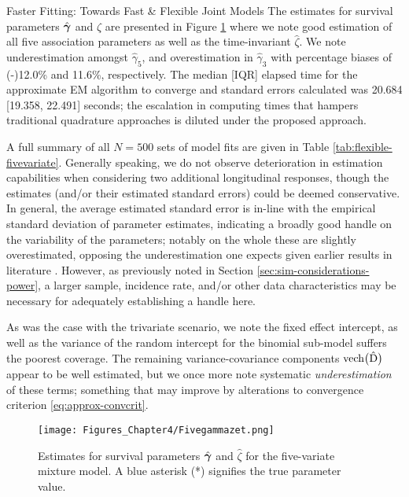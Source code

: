 \begin{chapter}{\label{cha:flexible}Faster Fitting: Towards Fast \& Flexible Joint Models}
The estimates for survival parameters $\hat{\bm{\gamma}}$ and $\hat{\zeta}$ are presented in Figure \ref{fig:flexible-sim-five} where we note good estimation of all five association parameters as well as the time-invariant $\hat{\zeta}$. We note underestimation amongst $\hat{\gamma}_5$, and overestimation in $\hat{\gamma}_3$ with percentage biases of (-)12.0\% and 11.6\%, respectively. The median [IQR] elapsed time for the approximate EM algorithm to converge and standard errors calculated was 20.684 [19.358, 22.491] seconds; the escalation in computing times that hampers traditional quadrature approaches is diluted under the proposed approach. 

A full summary of all $N=500$ sets of model fits are given in Table \ref{tab:flexible-fivevariate}. Generally speaking, we do not observe deterioration in estimation capabilities when considering two additional longitudinal responses, though the estimates (and/or their estimated standard errors) could be deemed conservative. In general, the average estimated standard error is in-line with the empirical standard deviation of parameter estimates, indicating a broadly good handle on the variability of the parameters; notably on the whole these are slightly overestimated, opposing the underestimation one expects given earlier results in literature \citep{Hsieh2006}. However, as previously noted in Section \ref{sec:sim-considerations-power}, a larger sample, incidence rate, and/or other data characteristics may be necessary for adequately establishing a handle here.

As was the case with the trivariate scenario, we note the fixed effect intercept, as well as the variance of the random intercept for the binomial sub-model suffers the poorest coverage. The remaining variance-covariance components $\text{vech}\big(\hat{\mathrm{D}}\big)$ appear to be well estimated, but we once more note systematic \textit{underestimation} of these terms; something that may improve by alterations to convergence criterion \eqref{eq:approx-convcrit}.

\begin{figure}[ht]
    \centering
    \texttt{[image: Figures\_Chapter4/Fivegammazet.png]}
    \caption{Estimates for survival parameters $\hat{\bm{\gamma}}$ and $\hat{\zeta}$ for the five-variate mixture model. A blue asterisk (*) signifies the true parameter value.}
    \label{fig:flexible-sim-five}
\end{figure}


\end{chapter}
